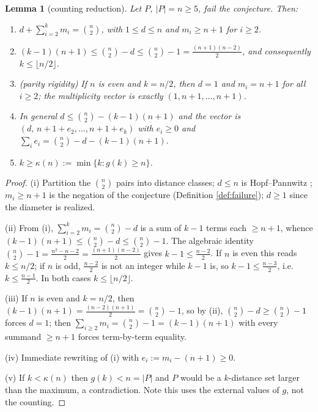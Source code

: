 \documentclass[11pt]{article}
\newtheorem{lemma}[theorem]{Lemma}
\theoremstyle{definition}
\theoremstyle{remark}
\begin{document}
\begin{lemma}[counting reduction]\label{lem:counting}
Let $P$, $|P| = n \ge 5$, fail the conjecture. Then:
\begin{enumerate}
\item[(i)] $d + \sum_{i=2}^k m_i = \binom{n}{2}$, with $1 \le d \le n$ and $m_i \ge n+1$
for $i \ge 2$.
\item[(ii)] $(k-1)(n+1) \le \binom{n}{2} - d \le \binom{n}{2} - 1 = \frac{(n+1)(n-2)}{2}$,
and consequently $k \le \lfloor n/2 \rfloor$.
\item[(iii)] (parity rigidity) If $n$ is even and $k = n/2$, then $d = 1$ and $m_i = n+1$
for all $i \ge 2$; the multiplicity vector is exactly $(1, n+1, \dots, n+1)$.
\item[(iv)] In general $d \le \binom{n}{2} - (k-1)(n+1)$ and the vector is
$(d,\, n+1+e_2, \dots, n+1+e_k)$ with $e_i \ge 0$ and
$\sum_i e_i = \binom{n}{2} - d - (k-1)(n+1)$.
\item[(v)] $k \ge \kappa(n) := \min\{k : g(k) \ge n\}$.
\end{enumerate}
\end{lemma}

\begin{proof}
(i) Partition the $\binom{n}{2}$ pairs into distance classes; $d \le n$ is Hopf--Pannwitz
\cite{HoPa34}; $m_i \ge n+1$ is the negation of the conjecture (Definition
\ref{def:failure}); $d \ge 1$ since the diameter is realized.

(ii) From (i), $\sum_{i=2}^{k} m_i = \binom{n}{2} - d$ is a sum of $k-1$ terms each
$\ge n+1$, whence $(k-1)(n+1) \le \binom{n}{2} - d \le \binom{n}{2} - 1$. The algebraic
identity $\binom{n}{2} - 1 = \frac{n^2-n-2}{2} = \frac{(n+1)(n-2)}{2}$ gives
$k-1 \le \frac{n-2}{2}$. If $n$ is even this reads $k \le n/2$; if $n$ is odd,
$\frac{n-2}{2}$ is not an integer while $k - 1$ is, so $k - 1 \le \frac{n-3}{2}$, i.e.\
$k \le \frac{n-1}{2}$. In both cases $k \le \lfloor n/2 \rfloor$.

(iii) If $n$ is even and $k = n/2$, then
$(k-1)(n+1) = \frac{(n-2)(n+1)}{2} = \binom{n}{2} - 1$, so by (ii),
$\binom{n}{2} - d \ge \binom{n}{2} - 1$ forces $d = 1$; then
$\sum_{i \ge 2} m_i = \binom{n}{2} - 1 = (k-1)(n+1)$ with every summand $\ge n+1$ forces
term-by-term equality.

(iv) Immediate rewriting of (i) with $e_i := m_i - (n+1) \ge 0$.

(v) If $k < \kappa(n)$ then $g(k) < n = |P|$ and $P$ would be a $k$-distance set larger
than the maximum, a contradiction. Note this uses the external values of $g$, not the
counting.
\end{proof}
\end{document}
